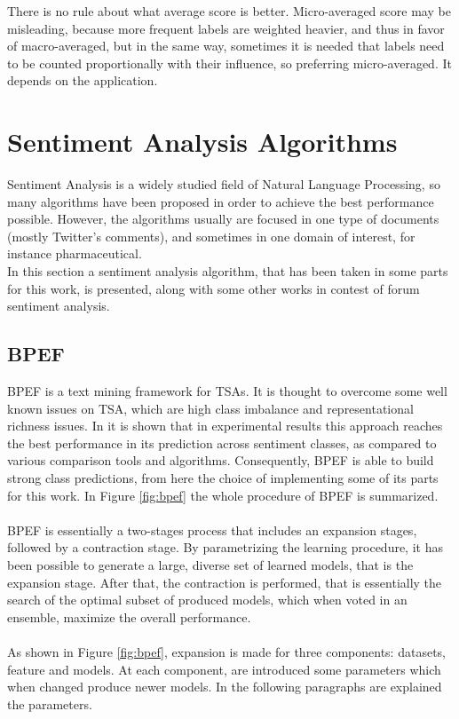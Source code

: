 There is no rule about what average score is better. Micro-averaged score may be misleading, because more frequent labels are weighted heavier, and thus in favor of macro-averaged, but in the same way, sometimes it is needed that labels need to be counted proportionally with their influence, so preferring micro-averaged. It depends on the application.



\section{Sentiment Analysis Algorithms}

Sentiment Analysis is a widely studied field of Natural Language Processing, so many algorithms have been proposed in order to achieve the best performance possible. However, the algorithms usually are focused in one type of documents (mostly Twitter's comments), and sometimes in one domain of interest, for instance pharmaceutical.\\
In this section a sentiment analysis algorithm, that has been taken in some parts for this work, is presented, along with some other works in contest of forum sentiment analysis.


\subsection{BPEF}

\ac{BPEF} \cite{Hassan2013TwitterSA} is a text mining framework for \aclp{TSA}. It is thought to overcome some well known issues on \ac{TSA}, which are high class imbalance and representational richness issues. In \cite{Zimbra:2018:STS:3210372.3185045} it is shown that in experimental results this approach reaches the best performance in its prediction across sentiment classes, as compared to various comparison tools and algorithms. Consequently, \ac{BPEF} is able to build strong class predictions, from here the choice of implementing some of its parts for this work. In Figure \ref{fig:bpef} the whole procedure of \ac{BPEF} is summarized.\\
\\
\ac{BPEF} is essentially a two-stages process that includes an expansion stages, followed by a contraction stage. By parametrizing the learning procedure, it has been possible to generate a large, diverse set of learned models, that is the expansion stage. After that, the contraction is performed, that is essentially the search of the optimal subset of produced models, which when voted in an ensemble, maximize the overall performance.\\
\\
As shown in Figure \ref{fig:bpef}, expansion is made for three components: datasets, feature and models. At each component, are introduced some parameters which when changed produce newer models. In the following paragraphs are explained the parameters.


